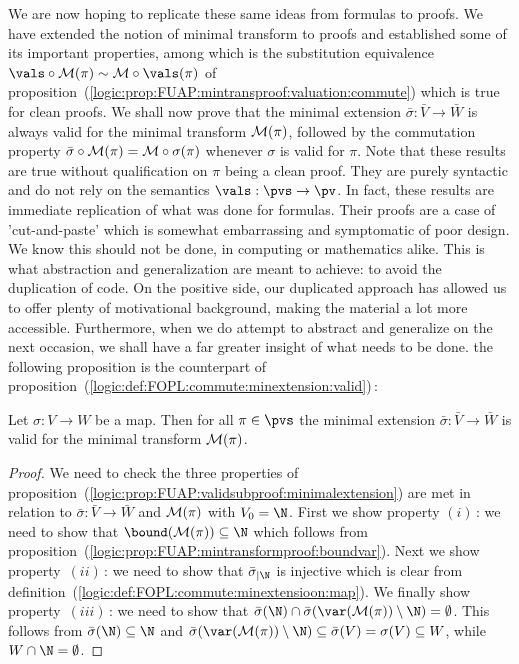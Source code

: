 We are now hoping to replicate these same ideas from formulas to
proofs. We have extended the notion of minimal transform to proofs
and established some of its important properties, among which is the
substitution equivalence $\vals\circ{\cal M}(\pi)\sim{\cal
M}\circ\vals(\pi)$ of
proposition~(\ref{logic:prop:FUAP:mintransproof:valuation:commute})
which is true for clean proofs. We shall now prove that the minimal
extension $\bar{\sigma}:\bar{V}\to\bar{W}$ is always valid for the
minimal transform ${\cal M}(\pi)$, followed by the commutation
property $\bar{\sigma}\circ{\cal M}(\pi)={\cal M}\circ\sigma(\pi)$
whenever $\sigma$ is valid for $\pi$. Note that these results are
true without qualification on $\pi$ being a clean proof. They are
purely syntactic and do not rely on the semantics
$\vals:\pvs\to\pv$. In fact, these results are immediate replication
of what was done for formulas. Their proofs are a case of
'cut-and-paste' which is somewhat embarrassing and symptomatic of
poor design. We know this should not be done, in computing or
mathematics alike. This is what abstraction and generalization are
meant to achieve: to avoid the duplication of code. On the positive
side, our duplicated approach has allowed us to offer plenty of
motivational background, making the material a lot more accessible.
Furthermore, when we do attempt to abstract and generalize on the
next occasion, we shall have a far greater insight of what needs to
be done. the following proposition is the counterpart of
proposition~(\ref{logic:def:FOPL:commute:minextension:valid})\,:

\begin{prop}\label{logic:prop:FUAP:mintransformproof:minextension:valid}
Let $\sigma:V\to W$ be a map. Then for all $\pi\in\pvs$ the minimal
extension $\bar{\sigma}:\bar{V}\to\bar{W}$ is valid for the minimal
transform ${\cal M}(\pi)$.
\end{prop}
\begin{proof}
We need to check the three properties of
proposition~(\ref{logic:prop:FUAP:validsubproof:minimalextension})
are met in relation to $\bar{\sigma}:\bar{V}\to\bar{W}$ and ${\cal
M}(\pi)$ with $V_{0}=\N$. First we show property $(i)$\,: we need to
show that $\bound({\cal M}(\pi))\subseteq\N$ which follows from
proposition~(\ref{logic:prop:FUAP:mintransformproof:boundvar}). Next
we show property~$(ii)$\,: we need to show that $\bar{\sigma}_{|\N}$
is injective which is clear from
definition~(\ref{logic:def:FOPL:commute:minextensioon:map}). We
finally show property~$(iii)$\,: we need to show that
$\bar{\sigma}(\N)\cap\bar{\sigma}(\var({\cal
M}(\pi))\setminus\N)=\emptyset$. This follows from
$\bar{\sigma}(\N)\subseteq\N$ and $\bar{\sigma}(\var({\cal
M}(\pi))\setminus\N)\subseteq\bar{\sigma}(V)=\sigma(V)\subseteq W$,
while $W\cap\N = \emptyset$.
\end{proof}

